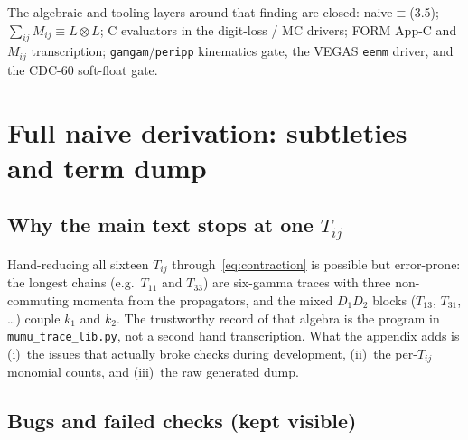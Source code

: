 \documentclass[11pt]{article}
\begin{document}
The algebraic and tooling layers around that finding are closed:
naive$\equiv$(3.5); $\sum_{ij}M_{ij}\equiv L\otimes L$; C evaluators in
the digit-loss / MC drivers; FORM App-C and $M_{ij}$ transcription;
\texttt{gamgam}/\texttt{peripp} kinematics gate, the VEGAS \texttt{eemm}
driver, and the CDC-60 soft-float gate.

\appendix

\section{Full naive derivation: subtleties and term dump}
\label{app:full-naive}

\subsection{Why the main text stops at one $T_{ij}$}

Hand-reducing all sixteen $T_{ij}$ through~\eqref{eq:contraction} is
possible but error-prone: the longest chains (e.g.\ $T_{11}$ and $T_{33}$)
are six-gamma traces with three non-commuting momenta from the
propagators, and the mixed $D_1 D_2$ blocks ($T_{13}$, $T_{31}$, \ldots)
couple $k_1$ and $k_2$. The trustworthy record of that algebra is the
program in \texttt{mumu\_trace\_lib.py}, not a second hand transcription.
What the appendix adds is (i)~the issues that actually broke checks during
development, (ii)~the per-$T_{ij}$ monomial counts, and (iii)~the raw
generated dump.

\subsection{Bugs and failed checks (kept visible)}
\end{document}
